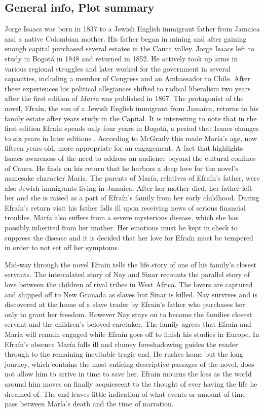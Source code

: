 \subsection{General info, Plot summary}
Jorge Isaacs was born in 1837 to a Jewish English immigrant father from Jamaica and a native Colombian mother. His father began in mining and after gaining enough capital purchased several estates in the Cauca valley. Jorge Isaacs left to study in Bogotá in 1848 and returned in 1852. He actively took up arms in various regional struggles and later worked for the government in several capacities, including a member of Congress and an Ambassador to Chile. After these experiences his political allegiances shifted to radical liberalism two years after the first edition of \textit{Maria} was published in 1867. 
The protagonist of the novel, Efraín, the son of a Jewish English immigrant from Jamaica, returns to his family estate after years study in the Capital.
It is interesting to note that in the first edition Efraín spends only four years in Bogotá, a period that Isaacs changes to six years in later editions \autocite[67]{Isaacs2012}. According to McGrady this made María's age, now fifteen years old, more appropriate for an engagement. A fact that highlights Isaacs awareness of the need to address an audience beyond the cultural confines of Cauca.
He finds on his return that he harbors a deep love for the novel's namesake character María.
The parents of María, relatives of Efraín's father, were also Jewish immigrants living in Jamaica.
After her mother died, her father left her and she is raised as a part of Efraín's family from her early childhood.
During Efraín's return visit his father falls ill upon receiving news of serious financial troubles.
María also suffers from a severe mysterious disease, which she has possibly inherited from her mother.
Her emotions must be kept in check to suppress the disease and it is decided that her love for Efraín must be tempered in order to not set off her symptoms.


Mid-way through the novel Efrain tells the life story of one of his family’s closest servants.
The intercalated story of Nay and Sinar recounts the parallel story of love between the children of rival tribes in West Africa.
The lovers are captured and shipped off to New Granada as slaves but Sinar is killed.
Nay survives and is discovered at the home of a slave trader by Efrain’s father who purchases her only to grant her freedom.
However Nay stays on to become the families closest servant and the children’s beloved caretaker.
The family agrees that Efraín and María will remain engaged while Efraín goes off to finish his studies in Europe.
In Efraín's absence María falls ill and clumsy foreshadowing guides the reader through to the remaining inevitable tragic end.
He rushes home but the long journey, which contains the most enticing descriptive passages of the novel, does not allow him to arrive in time to save her.
Efrain mourns the loss as the world around him moves on finally acquiescent to the thought of ever having the life he dreamed of.
The end leaves little indication of what events or amount of time pass between María's death and the time of narration.


